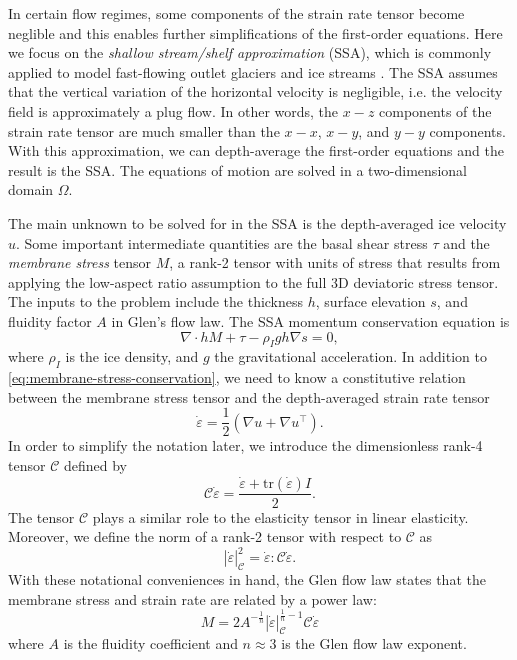 \documentclass[review,oneside]{igs}
\begin{document}
In certain flow regimes, some components of the strain rate tensor become neglible and this enables further simplifications of the first-order equations.
Here we focus on the \emph{shallow stream/shelf approximation} (SSA), which is commonly applied to model fast-flowing outlet glaciers and ice streams \citep{greve2009dynamics}.
The SSA assumes that the vertical variation of the horizontal velocity is negligible, i.e. the velocity field is approximately a plug flow.
In other words, the $x-z$ components of the strain rate tensor are much smaller than the $x-x$, $x-y$, and $y-y$ components.
With this approximation, we can depth-average the first-order equations and the result is the SSA.
The equations of motion are solved in a two-dimensional domain $\Omega$.

The main unknown to be solved for in the SSA is the depth-averaged ice velocity $u$.
Some important intermediate quantities are the basal shear stress $\tau$ and the \emph{membrane stress} tensor $M$, a rank-2 tensor with units of stress that results from applying the low-aspect ratio assumption to the full 3D deviatoric stress tensor.
The inputs to the problem include the thickness $h$, surface elevation $s$, and fluidity factor $A$ in Glen's flow law.
The SSA momentum conservation equation is
\begin{equation}
    \nabla\cdot hM + \tau - \rho_I gh\nabla s = 0,
    \label{eq:membrane-stress-conservation}
\end{equation}
where $\rho_I$ is the ice density, and $g$ the gravitational acceleration.
In addition to \eqref{eq:membrane-stress-conservation}, we need to know a constitutive relation between the membrane stress tensor and the depth-averaged strain rate tensor
\begin{equation}
    \dot\varepsilon = \frac{1}{2}\left(\nabla u + \nabla u^\top\right).
    \label{eq:strain-rate}
\end{equation}
In order to simplify the notation later, we introduce the dimensionless rank-4 tensor $\mathscr{C}$ defined by
\begin{equation}
    \mathscr{C}\dot\varepsilon = \frac{\dot\varepsilon + \text{tr}(\dot\varepsilon)I}{2}.
    \label{eq:elasticity-tensor}
\end{equation}
The tensor $\mathscr{C}$ plays a similar role to the elasticity tensor in linear elasticity.
Moreover, we define the norm of a rank-2 tensor with respect to $\mathscr{C}$ as
\begin{equation}
    |\dot\varepsilon|_{\mathscr{C}}^2 = \dot\varepsilon : \mathscr{C}\dot\varepsilon.
\end{equation}
With these notational conveniences in hand, the Glen flow law states that the membrane stress and strain rate are related by a power law:
\begin{equation}
    M = 2A^{-\frac{1}{n}}|\dot\varepsilon|_{\mathscr C}^{\frac{1}{n} - 1}\mathscr{C}\dot\varepsilon
    \label{eq:constitutive-relation}
\end{equation}
where $A$ is the fluidity coefficient and $n \approx 3$ is the Glen flow law exponent.
\end{document}
